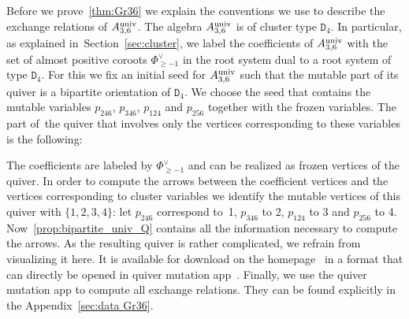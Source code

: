 \documentclass[10pt,a4paper]{amsart}
\newcommand{\thref}[1]{\ref{#1}}
\numberwithin{equation}{section}
\begin{document}
Before we prove~\thref{thm:Gr36} we explain the conventions we use to describe the exchange relations of $A_{3,6}^{\rm univ}$.
The algebra $A_{3,6}^{\rm univ}$ is of cluster type $\mathtt D_4$.
In particular, as explained in~Section~\ref{sec:cluster}, we label the coefficients of $A_{3,6}^{\rm univ}$ with the set of almost positive coroots $\Phi^{\vee}_{\geq -1} $ in the root system dual to a root system of type $\mathtt{D}_4$.
For this we fix an initial seed for $A_{3,6}^{\rm univ}$ such that the mutable part of its quiver is a bipartite orientation of $\mathtt{D}_4$.
We choose the seed that contains the mutable variables $p_{246}$, $p_{346}$, $p_{124}$ and $p_{256}$ together with the frozen variables. The part of~the quiver that involves only the vertices corresponding to these variables is the following:
\begin{center}
\end{center}
The coefficients are labeled by $\Phi^{\vee}_{\geq -1}$ and can be realized as frozen vertices of the quiver.
In order to compute the arrows between the coefficient vertices and the vertices corresponding to cluster variables we identify the mutable vertices of this quiver with $\{ 1, 2, 3, 4 \}$:
let $p_{246}$ correspond to~1, $p_{346}$ to 2, $p_{124}$ to 3 and $p_{256}$ to 4.
Now~\thref{prop:bipartite_univ_Q} contains all the information necessary to compute the arrows.
As the resulting quiver is rather complicated, we refrain from visualizing it here.
It is available for download on the homepage~\cite{homepage} in a format that can directly be opened in quiver mutation app~\cite{Qmut}.
Finally, we use the quiver mutation app to compute all exchange relations. They can be found explicitly in the Appendix~\ref{sec:data Gr36}.
\end{document}
